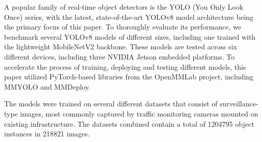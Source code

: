 A popular family of real-time object detectors is the YOLO (You Only Look Once)
series, with the latest, state-of-the-art YOLOv8 model architecture being the
primary focus of this paper. To thoroughly evaluate its performance, we
benchmark several YOLOv8 models of different sizes, including one trained with
the lightweight MobileNetV2 backbone. These models are tested across six
different devices, including three NVIDIA Jetson embedded platforms. To
accelerate the process of training, deploying and testing different models, this
paper utilized PyTorch-based libraries from the OpenMMLab project, including
MMYOLO and MMDeploy.

The models were trained on several different datasets that consist of
surveillance-type images, most commonly captured by traffic monitoring cameras
mounted on existing infrastructure. The datasets combined contain a total of
\num{1204795} object instances in \num{218821} images.


